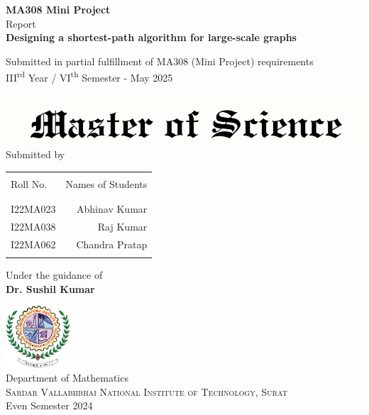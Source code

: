 \begin{titlepage}
	
\begin{center}
		
\textup{\small {\bf MA308 Mini Project} \\ Report}\\[0.2in]
		
\Large \textbf {Designing a shortest-path algorithm for large-scale graphs}\\[0.2in]
\begin{center}
\small {Submitted in partial fulfillment of MA308 (Mini Project) requirements \\ III\textsuperscript{rd} Year / VI\textsuperscript{th} Semester - May 2025}
\end{center}
\includegraphics[width=1\textwidth]{./msc-logo}\\[0.1in]
		
		
\normalsize Submitted by \\
\begin{table}[h]
\centering
\begin{tabular}{lr}\hline \\
Roll No. & Names of Students \\ \\ \hline
\\
I22MA023 & Abhinav Kumar \\ 
I22MA038 &  Raj Kumar \\
I22MA062 & Chandra Pratap \\ \\ \hline 
\end{tabular}
\end{table}
		
\vspace{.1in}
Under the guidance of\\
\large{\textbf{Dr. Sushil Kumar}}\\[0.2in]
		
\vfill
		
\includegraphics[width=0.18\textwidth]{./svnit-logo}\\[0.1in]
\Large{Department of Mathematics}\\
\normalsize
\textsc{Sardar Vallabhbhai National Institute of Technology, Surat}\\
\vspace{0.2cm}
Even Semester 2024
		
\end{center}
	
\end{titlepage}